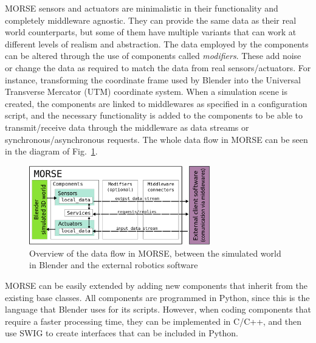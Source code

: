 \documentclass{llncs}
\newcommand{\serge}[1]{\nb{Serge}{blue}{#1}}
\begin{document}
MORSE sensors and actuators are minimalistic in their functionality and completely
middleware agnostic. They can provide the same data as their real
world counterparts, but some of them have multiple variants that can work
at different levels of realism and abstraction.
The data employed by the components can be altered through the use of
components called \emph{modifiers}. These add noise or change the data as
required to match the data from real sensors/actuators. For instance,
transforming the coordinate frame used by Blender into the Universal Transverse
Mercator (UTM) coordinate system.
When a simulation scene is created, the components are linked to middlewares as
specified in a configuration script, and the necessary functionality is added
to the components to be able to transmit/receive data through the middleware as
data streams or synchronous/asynchronous requests.
The whole data flow in MORSE can be seen in the diagram of
Fig.~\ref{fig:dataflow}.

\begin{figure}[ht!]
\centering
    \includegraphics[width=0.7\textwidth]{pics/simulation_main_loop-may2012.png}
\caption{Overview of the data flow in MORSE, between the simulated world
    in Blender and the external robotics software}
\label{fig:dataflow}
\end{figure}


MORSE can be easily extended by adding new components that inherit from the
existing base classes. All components are programmed in Python, since this is
the language that Blender uses for its scripts. However, when coding components
that require a faster processing time, they can be implemented in C/C++, and
then use SWIG to create interfaces that can be included in Python.
\end{document}

